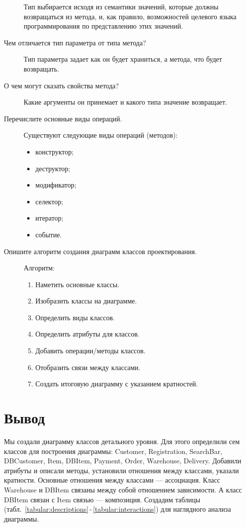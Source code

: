 \begin{description}
		Тип выбирается исходя из семантики значений, которые должны
		возвращаться из метода, и, как правило, возможностей
		целевого языка программирования по представлению этих значений.
	\item [Чем отличается тип параметра от типа метода?]
		Тип параметра задает как он будет храниться, а метода, что будет
		возвращать.
	\item [О чем могут сказать свойства метода?]
		Какие аргументы он принемает и какого типа значение возвращает.
	\item [Перечислите основные виды операций.]
		Существуют следующие виды операций (методов):
		\begin{itemize}
			\item конструктор;
			\item деструктор;
			\item модификатор;
			\item селектор;
			\item итератор;
			\item событие.
		\end{itemize}
	\item [Опишите алгоритм создания диаграмм классов
		проектирования.]
		Алгоритм:
		\begin{enumerate}
			\item Наметить основные классы.
			\item Изобразить классы на диаграмме.
			\item Определить виды классов.
			\item Определить атрибуты для классов.
			\item Добавить операции/методы классов.
			\item Отобразить связи между классами.
			\item Создать итоговую диаграмму с указанием кратностей.
		\end{enumerate}

\end{description}

\clearpage

\section*{\LARGE Вывод}
Мы создали диаграмму классов детального уровня.
Для этого определили сем классов для построения диаграммы: Customer,
Registration, SearchBar, DBCustomer, Item, DBItem, Payment, Order, Warehouse,
Delivery. Добавили атрибуты и описали методы, установили отношения между
классами, указали кратности.
Основные отношения между классами --- ассоциация. Класс Warehouse и
DBItem связаны между собой отношением зависимости.
А класс DBItem связан с Item связью --- композиция. Создадим таблицы
(табл.~\ref{tabular:descriptions}\,-\,\ref{tabular:interactions})
для наглядного анализа диаграммы.

